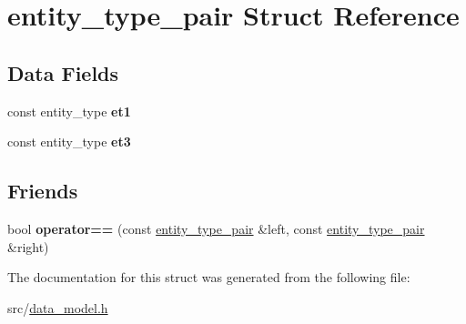 \hypertarget{structentity__type__pair}{}\section{entity\+\_\+type\+\_\+pair Struct Reference}
\label{structentity__type__pair}
\subsection*{Data Fields}
\begin{DoxyCompactItemize}
\item 
\mbox{\label{structentity__type__pair_aac00f0d65f32a57745f708c2b1cd9b1f}} 
const entity\+\_\+type {\bfseries et1}
\item 
\mbox{\label{structentity__type__pair_af1298e0bc96d48d5ae9b6bcdd0430ea3}} 
const entity\+\_\+type {\bfseries et3}
\end{DoxyCompactItemize}
\subsection*{Friends}
\begin{DoxyCompactItemize}
\item 
\mbox{\label{structentity__type__pair_ab148ef41047fcbd537a8f98b11e11045}} 
bool {\bfseries operator==} (const \hyperlink{structentity__type__pair}{entity\+\_\+type\+\_\+pair} \&left, const \hyperlink{structentity__type__pair}{entity\+\_\+type\+\_\+pair} \&right)
\end{DoxyCompactItemize}


The documentation for this struct was generated from the following file\+:\begin{DoxyCompactItemize}
\item 
src/\hyperlink{data__model_8h}{data\+\_\+model.\+h}\end{DoxyCompactItemize}
